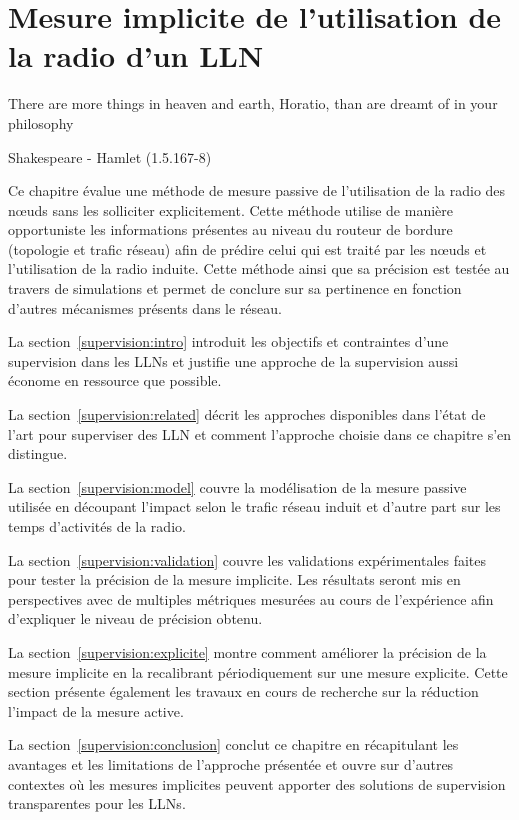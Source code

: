 
\chapter{Mesure implicite de l'utilisation de la radio d'un \ac{LLN}} %
\label{supervision}

\epigraph{There are more things in heaven and earth, Horatio, than are  dreamt of in your philosophy}{Shakespeare - Hamlet (1.5.167-8)}

\minitoc

Ce chapitre évalue une méthode de mesure passive de l'utilisation de la radio des nœuds sans les solliciter explicitement.
Cette méthode utilise de manière opportuniste les informations présentes au niveau du routeur de bordure (topologie et trafic réseau) afin de prédire celui qui est traité par les nœuds et l'utilisation de la radio induite.
Cette méthode ainsi que sa précision est testée au travers de simulations et permet de conclure sur sa pertinence en fonction d'autres mécanismes présents dans le réseau.

La section~\ref{supervision:intro} introduit les objectifs et contraintes d'une supervision dans les \ac{LLN}s et justifie une approche de la supervision aussi économe en ressource que possible.

La section~\ref{supervision:related} décrit les approches disponibles dans l'état de l'art pour superviser des \ac{LLN} et comment l'approche choisie dans ce chapitre s'en distingue.

La section~\ref{supervision:model} couvre la modélisation de la mesure passive utilisée en découpant l'impact selon le trafic réseau induit et d'autre part sur les temps d'activités de la radio.

La section~\ref{supervision:validation} couvre les validations expérimentales faites pour tester la précision de la mesure implicite.
Les résultats seront mis en perspectives avec de multiples métriques mesurées au cours de l'expérience afin d'expliquer le niveau de précision obtenu.

La section~\ref{supervision:explicite} montre comment améliorer la précision de la mesure implicite en la recalibrant périodiquement sur une mesure explicite.
Cette section présente également les travaux en cours de recherche sur la réduction l'impact de la mesure active.

La section~\ref{supervision:conclusion} conclut ce chapitre en récapitulant les avantages et les limitations de l'approche présentée et ouvre sur d'autres contextes où les mesures implicites peuvent apporter des solutions de supervision transparentes pour les \ac{LLN}s.


